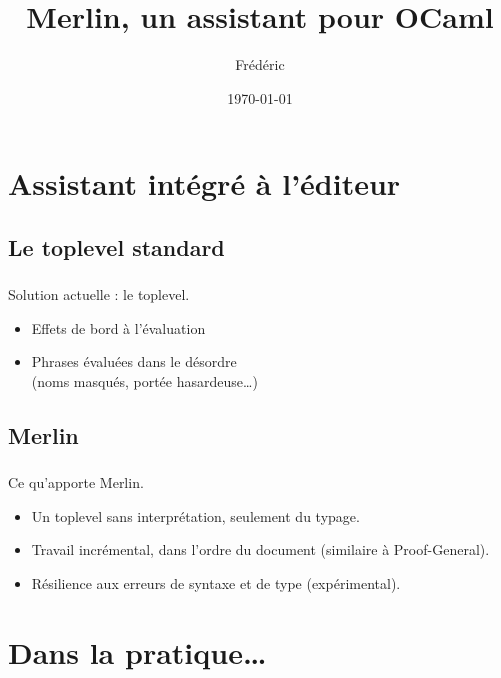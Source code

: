 \documentclass{beamer}
\title{Merlin, un assistant pour OCaml}
\author{Frédéric \bsc{Bour}}
\date{\today}
\newcommand{\sectitle}{\frametitle{\insertsection}}
\begin{document}
\begin{frame}
  \titlepage
\end{frame}


\section{Assistant intégré à l'éditeur}

\subsection{Le toplevel standard}

\begin{frame}
  \sectitle

  Solution actuelle : le toplevel.
  \pause

  \begin{itemize}
    \item Effets de bord à l'évaluation
      \pause
    \item Phrases évaluées dans le désordre
      \pause \\
      (noms masqués, portée hasardeuse…)
  \end{itemize}
\end{frame}

\subsection{Merlin}

\begin{frame}
  \sectitle

  Ce qu'apporte Merlin.
  \pause

  \begin{itemize}
    \item Un toplevel sans interprétation, seulement du typage.
      \pause
    \item Travail incrémental, dans l'ordre du document
      (similaire à Proof-General).
      \pause
    \item Résilience aux erreurs de syntaxe et de type (expérimental).
  \end{itemize}
\end{frame}

\section{Dans la pratique…}
\end{document}
